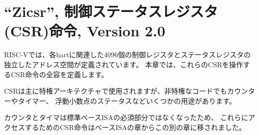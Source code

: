 \begin{comment}
\chapter{``Zicsr'', Control and Status Register (CSR) Instructions, Version 2.0}
\end{comment}
\chapter{``Zicsr'', 制御ステータスレジスタ(CSR)命令, Version 2.0}
\label{csrinsts}

\begin{comment}
RISC-V defines a separate address space of 4096 Control and Status
registers associated with each hart.  This chapter defines the full
set of CSR instructions that operate on these CSRs.
\end{comment}

RISC-Vでは、各hartに関連した4096個の制御レジスタとステータスレジスタの独立したアドレス空間が定義されています。
本章では、これらのCSRを操作するCSR命令の全容を定義します。

\begin{commentary}
\begin{comment}
  While CSRs are primarily used by the privileged architecture, there
  are several uses in unprivileged code including for counters and
  timers, and for floating-point status.
\end{comment}

CSRは主に特権アーキテクチャで使用されますが、非特権なコードでもカウンターやタイマー、
浮動小数点のステータスなどいくつかの用途があります。

\begin{comment}
  The counters and timers are no longer considered mandatory parts of
  the standard base ISAs, and so the CSR instructions required to
  access them have been moved out of the base ISA chapter into this
  separate chapter.
\end{comment}

カウンタとタイマは標準ベースISAの必須部分ではなくなったため、
これらにアクセスするためのCSR命令はベースISAの章からこの別の章に移されました。
\end{commentary}

\begin{comment}
\section{CSR Instructions}
\end{comment}
